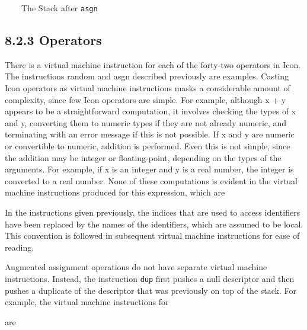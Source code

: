 \ \ \ \ The Stack after \texttt{asgn}


\subsection[8.2.3 Operators]{8.2.3 \textbf{Operators}}

There is a virtual machine instruction for each of the forty-two
operators in Icon. The instructions random and asgn described
previously are examples. Casting Icon operators as virtual machine
instructions masks a considerable amount of complexity, since few Icon
operators are simple. For example, although x + y appears to be a
straightforward computation, it involves checking the types of x and
y, converting them to numeric types if they are not already numeric,
and terminating with an error message if this is not possible. If x
and y are numeric or convertible to numeric, addition is
performed. Even this is not simple, since the addition may be integer
or floating-point, depending on the types of the arguments. For
example, if x is an integer and y is a real number, the integer is
converted to a real number. None of these computations is evident in
the virtual machine instructions produced for this expression, which
are

\goodbreak
{}

In the instructions given previously, the indices that are used to
access identifiers have been replaced by the names of the identifiers,
which are assumed to be local. This convention is followed in
subsequent virtual machine instructions for ease of reading.

Augmented assignment operations do not have separate virtual machine
instructions. Instead, the instruction \texttt{dup} first pushes a
null descriptor and then pushes a duplicate of the descriptor that was
previously on top of the stack.  For example, the virtual machine
instructions for


are

\goodbreak
{}

